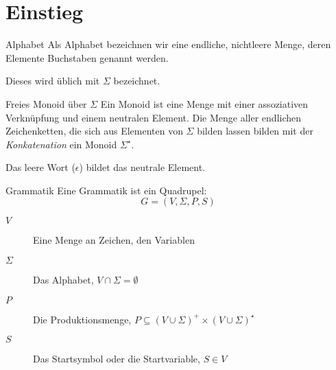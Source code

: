 \chapter{Einstieg}
\begin{definition}{Alphabet}
	Als Alphabet bezeichnen wir eine endliche, nichtleere Menge, deren Elemente Buchstaben genannt werden.

	Dieses wird üblich mit $\Sigma$ bezeichnet.
\end{definition}

\begin{definition}{Freies Monoid über $\Sigma$}
	Ein Monoid ist eine Menge mit einer assoziativen Verknüpfung und einem neutralen Element. Die Menge aller endlichen Zeichenketten, die sich aus Elementen von $\Sigma$ bilden lassen bilden mit der \emph{Konkatenation} ein Monoid $\Sigma^\star$.

	Das leere Wort ($\epsilon$) bildet das neutrale Element.
\end{definition}


\begin{definition}{Grammatik}
	Eine Grammatik ist ein Quadrupel:
	\begin{equation*}
		G=(V,\Sigma, P, S)
	\end{equation*}
	\begin{description}
		\item[$V$] Eine Menge an Zeichen, den Variablen
		\item[$\Sigma$] Das Alphabet, $V\cap\Sigma =\emptyset$
		\item[$P$] Die Produktionsmenge, $P\subseteq(V\cup\Sigma)^+\times(V\cup\Sigma)^\star$
		\item[$S$] Das Startsymbol oder die Startvariable, $S\in V$
	\end{description}
\end{definition}
